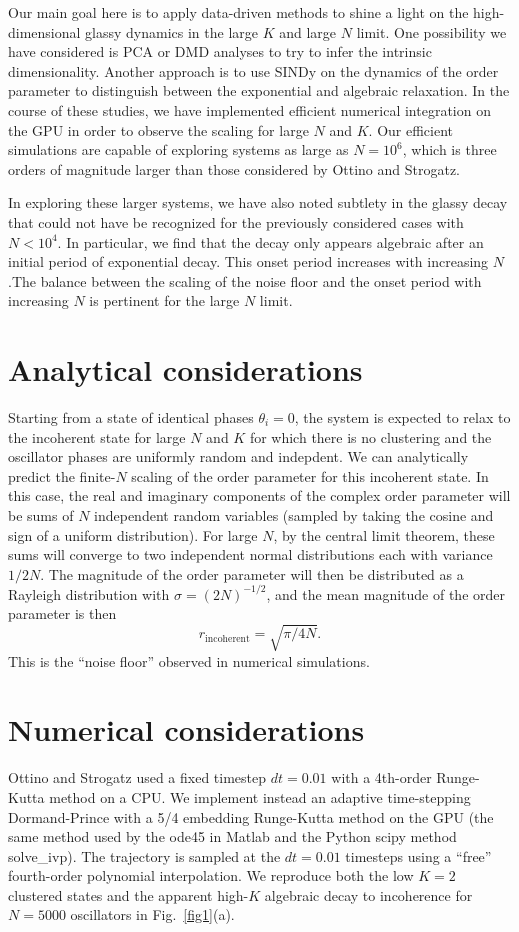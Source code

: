 \documentclass[aps,pre,amsmath,amssymb,floatfix,onecolumn,notitlepage,10pt]{revtex4-1}
\begin{document}
Our main goal here is to apply data-driven methods to shine a light on the high-dimensional glassy dynamics in the large $K$ and large $N$ limit. One possibility we have considered is PCA or DMD analyses to try to infer the intrinsic dimensionality.  Another approach is to use SINDy on the dynamics of the order parameter to distinguish between the exponential and algebraic relaxation.  In the course of these studies, we have implemented efficient numerical integration on the GPU in order to observe the scaling for large $N$ and $K$. Our efficient simulations are capable of exploring systems as large as $N=10^6$,  which is three orders of magnitude larger than those considered by Ottino and Strogatz. 

In exploring these larger systems, we have also noted subtlety in the glassy decay that could not have be recognized for the previously considered cases with $N<10^4$. In particular, we find that the decay only appears algebraic after an initial period of exponential decay. This onset period increases with increasing $N$.The balance between the scaling of the noise floor and the onset period with increasing $N$ is pertinent for the large $N$ limit.

\section{Analytical considerations}
Starting from a state of identical phases $\theta_i=0$, the system is expected to relax to the incoherent state for large $N$ and $K$ for which there is no clustering and the oscillator phases are uniformly random and indepdent. We can analytically predict the finite-$N$ scaling of the order parameter for this incoherent state. In this case,  the real and imaginary components of the complex order parameter will be sums of $N$ independent random variables (sampled by taking the cosine and sign of a uniform distribution). For large $N$, by the central limit theorem, these sums will converge to two independent normal distributions each with variance $1/2N$. The magnitude of the order parameter will then be distributed as a Rayleigh distribution with $\sigma=(2N)^{-1/2}$, and the mean magnitude of the order parameter is then 
\begin{equation}
r_{\mathrm{incoherent}}=\sqrt{\pi/4N}.  \label{incoherent}
\end{equation}
This is the ``noise floor'' observed in numerical simulations.

\section{Numerical considerations}
Ottino and Strogatz  used a fixed timestep $dt=0.01$ with a 4th-order Runge-Kutta method on a CPU.  We implement instead an adaptive time-stepping Dormand-Prince with a 5/4 embedding Runge-Kutta method on the GPU (the same method used by the ode45 in Matlab and the Python scipy method solve\_ivp).  The trajectory is sampled at the $dt=0.01$ timesteps using a ``free'' fourth-order polynomial interpolation. We reproduce both the low $K=2$ clustered states and the apparent high-$K$ algebraic decay to incoherence for $N=5000$ oscillators in Fig.~\ref{fig1}(a).
\end{document}
